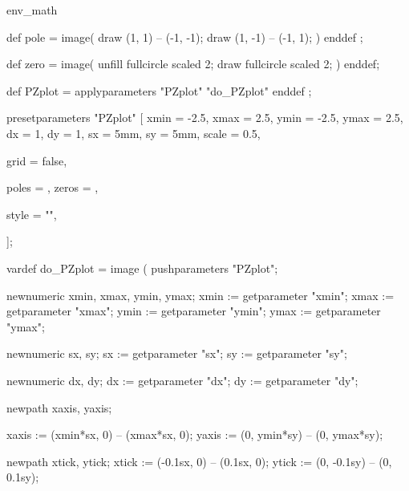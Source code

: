 \startenvironment env_math

 

\setupmathematics[collapsing=3]



def pole =
    image(
        draw (1, 1) -- (-1, -1);
        draw (1, -1) -- (-1, 1);
    )
enddef ;

def zero =
    image(
        unfill fullcircle scaled 2;
        draw   fullcircle scaled 2;
    )
enddef;

def PZplot = applyparameters "PZplot" "do_PZplot" enddef ;

presetparameters "PZplot" [
  xmin = -2.5,  xmax = 2.5,
  ymin = -2.5,  ymax = 2.5,
  dx   = 1,     dy   = 1,
  sx   = 5mm,   sy   = 5mm,
  scale = 0.5,

  grid = false,

  poles = { },
  zeros = { },

  style = "\switchtobodyfont[8pt]",

];

vardef do_PZplot =
  image (
    pushparameters "PZplot";

    newnumeric xmin, xmax, ymin, ymax;
    xmin := getparameter "xmin";
    xmax := getparameter "xmax";
    ymin := getparameter "ymin";
    ymax := getparameter "ymax";

    newnumeric sx, sy;
    sx := getparameter "sx";
    sy := getparameter "sy";

    newnumeric dx, dy;
    dx := getparameter "dx";
    dy := getparameter "dy";

    newpath xaxis, yaxis;

    xaxis := (xmin*sx, 0) -- (xmax*sx, 0);
    yaxis := (0, ymin*sy) -- (0, ymax*sy);

    newpath xtick, ytick;
    xtick := (-0.1sx, 0) -- (0.1sx, 0);
    ytick := (0, -0.1sy) -- (0, 0.1sy);

